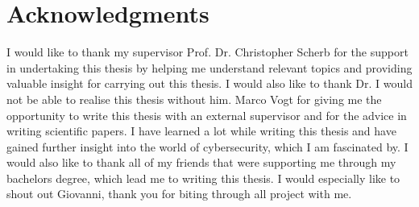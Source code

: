 \chapter{Acknowledgments}
I would like to thank my supervisor Prof. Dr. Christopher Scherb for the support in undertaking this thesis by helping me understand relevant topics and providing valuable insight for carrying out this thesis. I would also like to thank Dr. I would not be able to realise this thesis without him. Marco Vogt for giving me the opportunity to write this thesis with an external supervisor and for the advice in writing scientific papers. I have learned a lot while writing this thesis and have gained further insight into the world of cybersecurity, which I am fascinated by. I would also like to thank all of my friends that were supporting me through my bachelors degree, which lead me to writing this thesis. I would especially like to shout out Giovanni, thank you for biting through all project with me.
